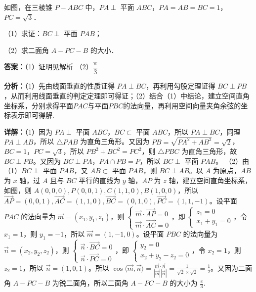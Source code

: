 \begin{question}[points=14]
如图，在三棱锥 $P-ABC$ 中，$PA\perp$ 平面 $ABC$，$PA=AB=BC=1$，$PC=\sqrt{3}$．

（1）求证：$BC\perp$ 平面 $PAB$；

（2）求二面角 $A-PC-B$ 的大小．
\begin{solution}
\textbf{答案：}（1）证明见解析 （2）$\dfrac{\pi}{3}$

\textbf{分析：}（1）先由线面垂直的性质证得 $PA\perp BC$，再利用勾股定理证得 $BC\perp PB$，从而利用线面垂直的判定定理即可得证；（2）结合（1）中结论，建立空间直角坐标系，分别求得平面$PAC$与平面$PBC$的法向量，再利用空间向量夹角余弦的坐标表示即可得解.

\textbf{详解：}（1）因为 $PA\perp$ 平面 $ABC$，$BC\subset$ 平面 $ABC$，所以 $PA\perp BC$，同理 $PA\perp AB$，所以 $\triangle PAB$ 为直角三角形。又因为 $PB=\sqrt{PA^2+AB^2}=\sqrt{2}$，$BC=1$，$PC=\sqrt{3}$，所以 $PB^2+BC^2=PC^2$，则 $\triangle PBC$ 为直角三角形，故 $BC\perp PB$。又因为 $BC\perp PA$，$PA\cap PB=P$，所以 $BC\perp$ 平面 $PAB$。
（2）由（1）$BC\perp$ 平面 $PAB$，又 $AB\subset$ 平面 $PAB$，则 $BC\perp AB$。以 $A$ 为原点，$AB$ 为 $x$ 轴，过 $A$ 且与 $BC$ 平行的直线为 $y$ 轴，$AP$ 为 $z$ 轴，建立空间直角坐标系，如图，则 $A(0,0,0), P(0,0,1), C(1,1,0), B(1,0,0)$，所以 $\overrightarrow{AP}=(0,0,1), \overrightarrow{AC}=(1,1,0), \overrightarrow{BC}=(0,1,0), \overrightarrow{PC}=(1,1,-1)$。设平面 $PAC$ 的法向量为 $\vec{m}=(x_1,y_1,z_1)$，则 $\begin{cases} \vec{m}\cdot\overrightarrow{AP}=0 \\ \vec{m}\cdot\overrightarrow{AC}=0 \end{cases}$，即 $\begin{cases} z_1=0 \\ x_1+y_1=0 \end{cases}$，令 $x_1=1$，则 $y_1=-1$，所以 $\vec{m}=(1,-1,0)$。设平面 $PBC$ 的法向量为 $\vec{n}=(x_2,y_2,z_2)$，则 $\begin{cases} \vec{n}\cdot\overrightarrow{BC}=0 \\ \vec{n}\cdot\overrightarrow{PC}=0 \end{cases}$，即 $\begin{cases} y_2=0 \\ x_2+y_2-z_2=0 \end{cases}$，令 $x_2=1$，则 $z_2=1$，所以 $\vec{n}=(1,0,1)$。所以 $\cos\langle\vec{m},\vec{n}\rangle = \frac{\vec{m}\cdot\vec{n}}{|\vec{m}||\vec{n}|} = \frac{1}{\sqrt{2}\times\sqrt{2}} = \frac12$。又因为二面角 $A-PC-B$ 为锐二面角，所以二面角 $A-PC-B$ 的大小为 $\frac{\pi}{3}$.
\end{solution}
\end{question}


